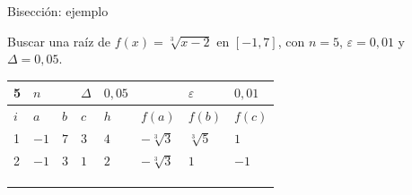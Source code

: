 \documentclass[main.tex]{subfiles}
\begin{document}
\begin{frame}[t]{Bisección: ejemplo}
\begin{minipage}[t][13mm][t]{\textwidth}\small Buscar una raíz de $f(x)=\sqrt[3]{x-2}$ en $[-1,7]$, con $n=5$, $\varepsilon=0{,}01$ y $\Delta=0{,}05$.\end{minipage}\par{\scriptsize\setlength{\tabcolsep}{2pt}\renewcommand{\arraystretch}{1}\begin{center}\begin{tabular}{|C{.04\textwidth}|C{.112\textwidth}|C{.112\textwidth}|C{.112\textwidth}|C{.112\textwidth}|C{.112\textwidth}|C{.112\textwidth}|C{.112\textwidth}|}
\hline
\rule{0pt}{4.3mm}5 & $n$ &  &  $\Delta$  & $0{,}05$ &  & $\varepsilon$ & $0{,}01$\\\hline
\rule{0pt}{4.3mm}$i$ & $a$ & $b$ & $c$ & $h$ & $f(a)$ & $f(b)$ & $f(c)$\\\hline
\rule{0pt}{4.3mm}1 & $-1$ & $7$ & $3$ & $4$ & $-\sqrt[3]3$ & $\sqrt[3]5$ & $1$\\\hline
\rule{0pt}{4.3mm}2 & $-1$ & $3$ & $1$ & $2$ & $-\sqrt[3]3$ & $1$ & $-1$\\\hline
\rule{0pt}{4.3mm} &  &  &  &  &  &  & \\\hline
\rule{0pt}{4.3mm} &  &  &  &  &  &  & \\\hline
\rule{0pt}{4.3mm} &  &  &  &  &  &  & \\\hline
\end{tabular}\end{center}}\begin{minipage}[t][10mm][t]{\textwidth}\footnotesize \end{minipage}
\end{frame}
\end{document}

